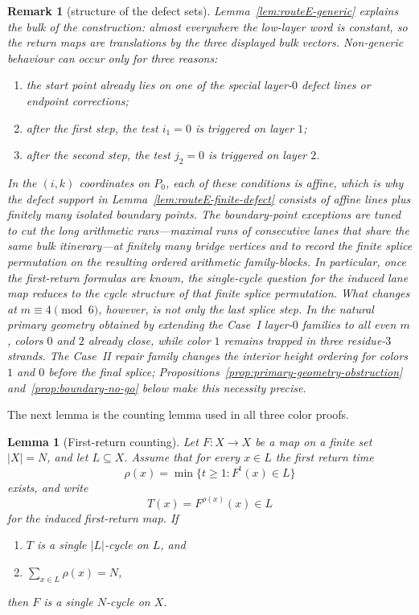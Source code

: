\documentclass[11pt]{article}
\newtheorem{lemma}{Lemma}
\newtheorem{remark}{Remark}
\begin{document}
\begin{remark}[structure of the defect sets]\label{rem:routeE-design}
Lemma~\ref{lem:routeE-generic} explains the bulk of the construction: almost everywhere the low-layer word is constant, so the return maps are translations by the three displayed bulk vectors.
Non-generic behaviour can occur only for three reasons:
\begin{enumerate}[label=\textup{(\alph*)},leftmargin=2em]
\item the start point already lies on one of the special layer-$0$ defect lines or endpoint corrections;
\item after the first step, the test $i_1=0$ is triggered on layer $1$;
\item after the second step, the test $j_2=0$ is triggered on layer $2$.
\end{enumerate}
In the $(i,k)$ coordinates on $P_0$, each of these conditions is affine, which is why the defect support in Lemma~\ref{lem:routeE-finite-defect} consists of affine lines plus finitely many isolated boundary points.
The boundary-point exceptions are tuned to cut the long arithmetic runs---maximal runs of consecutive lanes that share the same bulk itinerary---at finitely many bridge vertices and to record the finite splice permutation on the resulting ordered arithmetic family-blocks.
In particular, once the first-return formulas are known, the single-cycle question for the induced lane map reduces to the cycle structure of that finite splice permutation.
What changes at $m\equiv 4\pmod{6}$, however, is not only the last splice step.
In the natural primary geometry obtained by extending the Case~I layer-$0$ families to all even $m$, colors $0$ and $2$ already close, while color $1$ remains trapped in three residue-$3$ strands.
The Case~II repair family changes the interior height ordering for colors $1$ and $0$ before the final splice; Propositions~\ref{prop:primary-geometry-obstruction} and~\ref{prop:boundary-no-go} below make this necessity precise.
\end{remark}

The next lemma is the counting lemma used in all three color proofs.

\begin{lemma}[First-return counting]\label{lem:counting}
Let $F:X\to X$ be a map on a finite set $|X|=N$, and let $L\subseteq X$.
Assume that for every $x\in L$ the first return time
\[
\rho(x)=\min\{t\ge 1:F^t(x)\in L\}
\]
exists, and write
\[
T(x)=F^{\rho(x)}(x)\in L
\]
for the induced first-return map.
If
\begin{enumerate}[label=\textup{(\roman*)}]
\item $T$ is a single $|L|$-cycle on $L$, and
\item $\sum_{x\in L}\rho(x)=N$,
\end{enumerate}
then $F$ is a single $N$-cycle on $X$.
\end{lemma}
\end{document}
